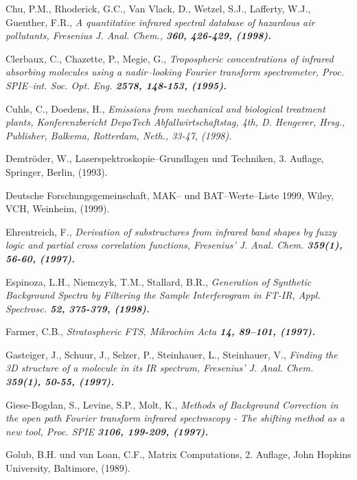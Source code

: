 \begin{thebibliography}{giese-bogdan,199797}
 Chu, P.M., Rhoderick, G.C., Van Vlack,
D., Wetzel, S.J., Lafferty, W.J., Guenther, F.R., \it A
quantitative infrared spectral database of hazardous air
pollutants\rm , Fresenius J. Anal. Chem., \bf 360\rm , 426-429,
(1998).

 Clerbaux, C., Chazette, P.,
Megie, G., \it Tropospheric concentrations of infrared absorbing
molecules using a nadir--looking Fourier transform
spectrometer\rm, Proc. SPIE--int. Soc. Opt. Eng. \bf 2578\rm,
148-153, (1995).

 Cuhls, C., Doedens, H., \it
Emissions from mechanical and biological treatment plants\rm ,
Konferenzbericht DepoTech Abfallwirtschaftstag, 4th, D. Hengerer,
Hrsg., Publisher, Balkema, Rotterdam, Neth., 33-47, (1998).

 Demtr\"{o}der, W.,
Laserspektroskopie--Grundlagen und Techniken, 3. Auflage,
Springer, Berlin, (1993).

 Deutsche Forschungsgemeinschaft, MAK--
und BAT--Werte--Liste 1999, Wiley, VCH, Weinheim, (1999).

 Ehrentreich, F.,
\it Derivation of substructures from infrared band shapes by fuzzy
logic and partial cross correlation functions\rm , Fresenius' J.
Anal. Chem. \bf 359(1)\rm , 56-60, (1997).

 Espinoza, L.H., Niemczyk,
T.M., Stallard, B.R., \it Generation of Synthetic Background
Spectra by Filtering the Sample Interferogram in FT-IR\rm , Appl.
Spectrosc. \bf 52\rm , 375-379, (1998).

Farmer, C.B., \it Stratospheric
FTS\rm , Mikrochim Acta \bf 14\rm , 89--101, (1997).

 Gasteiger, J., Schuur, J.,
Selzer, P., Steinhauer, L., Steinhauer, V., \it Finding the 3D
structure of a molecule in its IR spectrum\rm , Fresenius' J.
Anal. Chem. \bf 359(1)\rm , 50-55, (1997).

 Giese-Bogdan, S., Levine,
S.P., Molt, K., \it Methods of Background Correction in the open
path Fourier transform infrared spectroscopy - The shifting method
as a new tool\rm , Proc. SPIE \bf 3106\rm , 199-209, (1997).

 Golub, B.H. und van Loan, C.F.,
Matrix Computations, 2. Auflage, John Hopkins University,
Baltimore, (1989).


\end{thebibliography}
